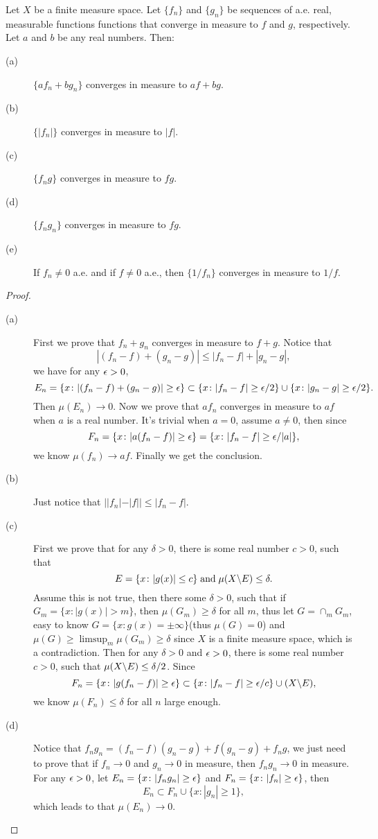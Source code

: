  \begin{pro}%
	Let $X$ be a finite measure space. Let $\{f_n\}$ and $\{g_n\}$ be sequences of a.e. real, measurable functions functions that converge in measure to $f$ and $g$, respectively. Let $a$ and $b$ be any real numbers. Then:
	\begin{description}
	\item[(a)] $\{af_n+bg_n\}$ converges in measure to $af+bg$.
	\item[(b)] $\{|f_n|\}$ converges in measure to $|f|$.
	\item[(c)] $\{f_n g\}$ converges in measure to $fg$.
	\item[(d)] $\{f_ng_n\}$ converges in measure to $fg$.
	\item[(e)] If $f_n\neq 0$ a.e. and if $f\neq 0$ a.e., then $\{1/f_n\}$ converges in measure to $1/f$.
	\end{description}
\end{pro}
\begin{proof}
	\begin{description}
	\item[(a)] First we prove that $f_n+g_n$ converges in measure to $f+g$. Notice that
	\[|(f_n-f)+(g_n-g)|\leq |f_n-f|+|g_n-g|,\]
	we have for any $\epsilon>0$,
	\[E_n=\{x\colon |(f_n-f)+(g_n-g)|\geq\epsilon\}\subset\{x\colon |f_n-f|\geq\epsilon/2\}\cup\{x\colon |g_n-g|\geq\epsilon/2\}.\]
	Then $\mu(E_n)\to 0$. Now we prove that $af_n$ converges in measure to $af$ when $a$ is a real number.
	It's trivial when $a=0$, assume $a\neq 0$, then since
	\[F_n=\{x\colon |a(f_n-f)|\geq \epsilon\}=\{x\colon |f_n-f|\geq \epsilon/|a|\},\]
	we know $\mu(f_n)\to af$. Finally we get the conclusion.
	\item[(b)] Just notice that $||f_n|-|f||\leq|f_n-f|$.
	\item[(c)] First we prove that for any $\delta>0$, there is some real number $c>0$, such that 
	\[E=\{x\colon |g(x)|\leq c\}\;\mbox{and}\;\mu(X\backslash E)\leq \delta.\] Assume this is not true, then there some $\delta>0$, such that if $G_m=\{x\colon |g(x)|>m\}$, then $\mu(G_m)\geq \delta$ for all $m$, thus let $G=\cap_m G_m$, easy to know $G=\{x\colon g(x)=\pm\infty\}$(thus $\mu(G)=0$) and $\mu(G)\geq\limsup_m \mu(G_m)\geq \delta$ since $X$ is a finite measure space, which is a contradiction. Then for any $\delta>0$ and $\epsilon>0$, there is some real number $c>0$, such that $\mu(X\backslash E)\leq\delta/2$. Since
	\[F_n=\{x\colon |g(f_n-f)|\geq \epsilon\}\subset \{x\colon |f_n-f|\geq \epsilon/c\}\cup (X\backslash E),\]
	we know $\mu(F_n)\leq \delta$ for all $n$ large enough.
	\item[(d)] Notice that $f_ng_n=(f_n-f)(g_n-g)+f(g_n-g)+f_ng$, we just need to prove that if $f_n\to 0$ and $g_n\to 0$ in measure, then $f_n g_n\to 0$ in measure. For any $\epsilon>0$, let $E_n=\{x\colon |f_ng_n|\geq \epsilon\}$ and $F_n=\{x\colon |f_n|\geq \epsilon\}$, then
	\[E_n\subset F_n\cup \{x\colon |g_n|\geq 1\},\]
	which leads to that $\mu(E_n)\to 0$.
	\end{description}
\end{proof}

